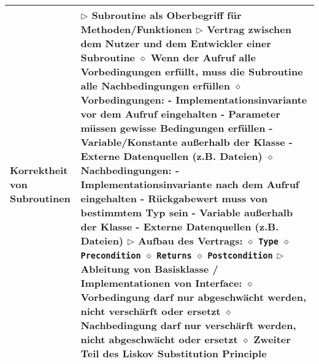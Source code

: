 \begin{longtable}{ | p{} p{} | }
	\makecell[l]{Korrektheit von \\ Subroutinen} & \makecell[l]{
	$\rhd$ Subroutine als Oberbegriff für Methoden/Funktionen \\
	$\rhd$ Vertrag zwischen dem Nutzer und dem Entwickler einer Subroutine \\
	\hspace{0.4cm} $\diamond$ Wenn der Aufruf alle Vorbedingungen erfüllt, \\
	\hspace{0.8cm} muss die Subroutine alle Nachbedingungen erfüllen \\
	\hspace{0.4cm} $\diamond$ Vorbedingungen: \\
	\hspace{0.6cm} - Implementationsinvariante vor dem Aufruf eingehalten \\
	\hspace{0.6cm} - Parameter müssen gewisse Bedingungen erfüllen \\
	\hspace{0.6cm} - Variable/Konstante außerhalb der Klasse \\
	\hspace{0.6cm} - Externe Datenquellen (z.B. Dateien) \\
	\hspace{0.4cm} $\diamond$ Nachbedingungen: \\
	\hspace{0.6cm} - Implementationsinvariante nach dem Aufruf eingehalten \\
	\hspace{0.6cm} - Rückgabewert muss von bestimmtem Typ sein \\
	\hspace{0.6cm} - Variable außerhalb der Klasse \\
	\hspace{0.6cm} - Externe Datenquellen (z.B. Dateien) \\
	$\rhd$ Aufbau des Vertrags: \\
	\hspace{0.4cm} $\diamond$ \texttt{Type} \\
	\hspace{0.4cm} $\diamond$ \texttt{Precondition} \\
	\hspace{0.4cm} $\diamond$ \texttt{Returns} \\
	\hspace{0.4cm} $\diamond$ \texttt{Postcondition} \\
	$\rhd$ Ableitung von Basisklasse / Implementationen von Interface: \\
	\hspace{0.4cm} $\diamond$ Vorbedingung darf nur abgeschwächt werden, nicht verschärft oder ersetzt \\
	\hspace{0.4cm} $\diamond$ Nachbedingung darf nur verschärft werden, nicht abgeschwächt oder ersetzt \\
	\hspace{0.4cm} $\diamond$ Zweiter Teil des Liskov Substitution Principle} \\ \hline
	

\end{longtable}
